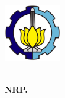 {%

\halamanKosong


\begin{flushleft}
    \includegraphics[width=25mm]{./halaman-depan/00-Logo-ITS.png}
\end{flushleft}
    
\vspace{24mm}
    
\noindent {\textsf{\color{black}{%
\textbf{\kodeTAInggris} %
}}}
    
\vspace{4mm}
    
\begin{flushleft}
    \noindent {\Large\textsf{\color{black}
    {\MakeUppercase{\textbf{\judulTAInggris}}}}}
\end{flushleft}
    
\vspace{4mm}
    
{\noindent\textsf{\color{black}
{\MakeUppercase{\textbf{\namaMahasiswa}\\[-2mm]
\textbf{NRP. \noIndukMahasiswa}}}}}
    
\vspace{3mm}
    
{\noindent\textsf{}}
    
\vspace{3mm}
    
{\noindent\textsf{\color{black}{%
    \textbf{\namaDepartemenInggris}\\[-2mm]
    \textbf{\namaFakultasInggris}\\[-2mm]
    \textbf{\namaUniversitas}\\[-2mm]
    \textbf{\namaKota}\\[-2mm]
    \textbf{\the\year}
}}}

}